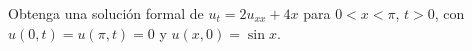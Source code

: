 Obtenga una solución formal de $u_t=2u_{xx}+4x$ para $0<x<\pi$, $t>0$, con $u(0,t)=u(\pi,t)=0$ y $u(x,0)=\sin x$.
